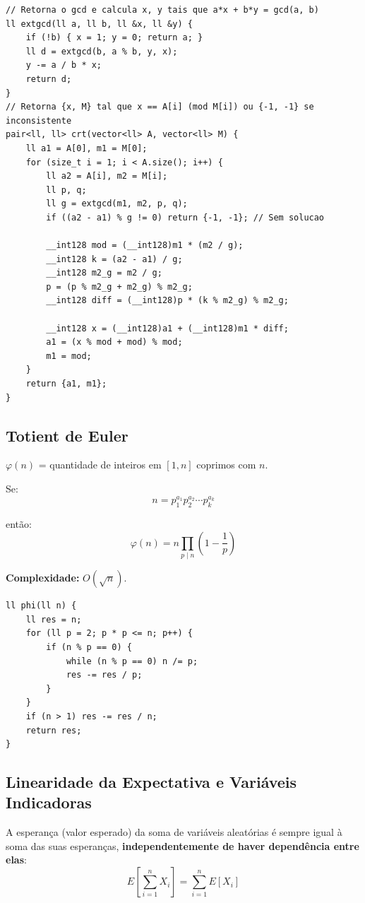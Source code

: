 \begin{lstlisting}
// Retorna o gcd e calcula x, y tais que a*x + b*y = gcd(a, b)
ll extgcd(ll a, ll b, ll &x, ll &y) {
    if (!b) { x = 1; y = 0; return a; }
    ll d = extgcd(b, a % b, y, x);
    y -= a / b * x;
    return d;
}
// Retorna {x, M} tal que x == A[i] (mod M[i]) ou {-1, -1} se inconsistente
pair<ll, ll> crt(vector<ll> A, vector<ll> M) {
    ll a1 = A[0], m1 = M[0];
    for (size_t i = 1; i < A.size(); i++) {
        ll a2 = A[i], m2 = M[i];
        ll p, q;
        ll g = extgcd(m1, m2, p, q);
        if ((a2 - a1) % g != 0) return {-1, -1}; // Sem solucao
        
        __int128 mod = (__int128)m1 * (m2 / g);
        __int128 k = (a2 - a1) / g;
        __int128 m2_g = m2 / g;
        p = (p % m2_g + m2_g) % m2_g;
        __int128 diff = (__int128)p * (k % m2_g) % m2_g;
        
        __int128 x = (__int128)a1 + (__int128)m1 * diff;
        a1 = (x % mod + mod) % mod;
        m1 = mod;
    }
    return {a1, m1};
}
\end{lstlisting}


\subsection{Totient de Euler}

$\varphi(n)$ = quantidade de inteiros em $[1,n]$
coprimos com $n$.

Se:
\[
n = p_1^{a_1}p_2^{a_2}\cdots p_k^{a_k}
\]

então:
\[
\varphi(n)
=
n
\prod_{p \mid n}
\left(1-\frac{1}{p}\right)
\]

\textbf{Complexidade:} $O(\sqrt n)$.

\begin{lstlisting}
ll phi(ll n) {
    ll res = n;
    for (ll p = 2; p * p <= n; p++) {
        if (n % p == 0) {
            while (n % p == 0) n /= p;
            res -= res / p;
        }
    }
    if (n > 1) res -= res / n;
    return res;
}
\end{lstlisting}


\subsection{Linearidade da Expectativa e Variáveis Indicadoras}

A esperança (valor esperado) da soma de variáveis aleatórias é sempre igual à soma das suas esperanças, \textbf{independentemente de haver dependência entre elas}:
\[
E\left[\sum_{i=1}^n X_i\right] = \sum_{i=1}^n E[X_i]
\]

